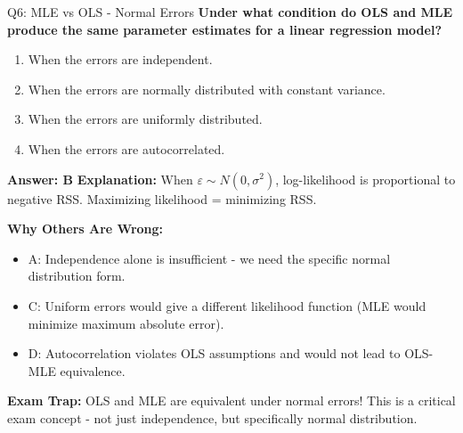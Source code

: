 \documentclass[8pt]{beamer}
\begin{document}
	\begin{frame}{Q6: MLE vs OLS - Normal Errors}
		\fontsize{6.5}{7.5}\selectfont
		\textbf{Under what condition do OLS and MLE produce the same parameter estimates for a linear regression model?}
		
		\begin{enumerate}
			\item When the errors are independent.
			\item When the errors are normally distributed with constant variance.
			\item When the errors are uniformly distributed.
			\item When the errors are autocorrelated.
		\end{enumerate}
		
		\vspace{0.05cm}
		\textcolor{myblue}{\textbf{Answer: B}}
		\vspace{0.05cm}
		\textcolor{myblue}{\textbf{Explanation:}} When $\varepsilon \sim N(0, \sigma^2)$, log-likelihood is proportional to negative RSS. Maximizing likelihood = minimizing RSS.
		
		\vspace{0.05cm}
		\textcolor{myred}{\textbf{Why Others Are Wrong:}}
		\begin{itemize}
			\item \textcolor{myred}{A:} Independence alone is insufficient - we need the specific normal distribution form.
			\item \textcolor{myred}{C:} Uniform errors would give a different likelihood function (MLE would minimize maximum absolute error).
			\item \textcolor{myred}{D:} Autocorrelation violates OLS assumptions and would not lead to OLS-MLE equivalence.
		\end{itemize}
		
		\textcolor{myred}{\textbf{Exam Trap:}} OLS and MLE are \textcolor{myblue}{equivalent} under normal errors! This is a critical exam concept - not just independence, but specifically normal distribution.
	\end{frame}
	
\end{document}
